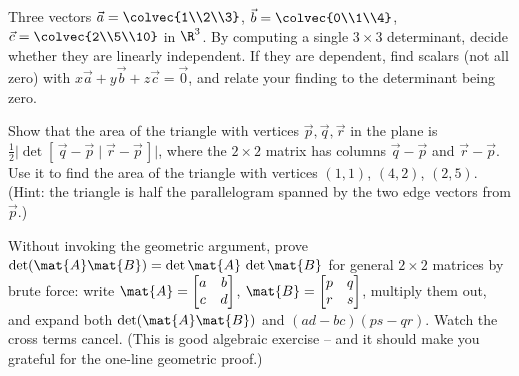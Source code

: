 \begin{exercise}
\label{ch21:ex-dependence}
Three vectors $\vec a = \colvec{1\\2\\3}$, $\vec b = \colvec{0\\1\\4}$,
$\vec c = \colvec{2\\5\\10}$ in $\R^3$. By computing a single $3\times 3$
determinant, decide whether they are linearly independent. If they are dependent,
find scalars (not all zero) with $x\vec a + y\vec b + z\vec c = \vec 0$, and relate
your finding to the determinant being zero.
\end{exercise}

\begin{exercise}
\label{ch21:ex-triangle}
Show that the area of the triangle with vertices $\vec p, \vec q, \vec r$ in the
plane is $\tfrac{1}{2}\bigl|\det[\,\vec q - \vec p \mid \vec r - \vec p\,]\bigr|$,
where the $2\times 2$ matrix has columns $\vec q - \vec p$ and $\vec r - \vec p$.
Use it to find the area of the triangle with vertices $(1,1)$, $(4,2)$, $(2,5)$.
(Hint: the triangle is half the parallelogram spanned by the two edge vectors
from $\vec p$.)
\end{exercise}

\begin{exercise}
\label{ch21:ex-product-proof}
Without invoking the geometric argument, prove $\det(\mat{A}\mat{B}) =
\det\mat{A}\,\det\mat{B}$ for general $2\times 2$ matrices by brute force: write
$\mat{A} = \begin{bmatrix} a & b \\ c & d \end{bmatrix}$,
$\mat{B} = \begin{bmatrix} p & q \\ r & s \end{bmatrix}$, multiply them out, and
expand both $\det(\mat{A}\mat{B})$ and $(ad-bc)(ps-qr)$. Watch the cross terms
cancel. (This is good algebraic exercise -- and it should make you grateful for the
one-line geometric proof.)
\end{exercise}
